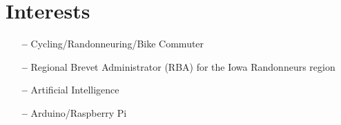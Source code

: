 \documentclass{my_cv}
\begin{document}
\section{Interests}
\begin{itemize}[leftmargin=10pt, noitemsep]
    \item[\textbf{--}] Cycling/Randonneuring/Bike Commuter
    \item[\textbf{--}] Regional Brevet Administrator (RBA) for the Iowa Randonneurs region
    \item[\textbf{--}] Artificial Intelligence
    \item[\textbf{--}] Arduino/Raspberry Pi
\end{itemize}


\end{document}
